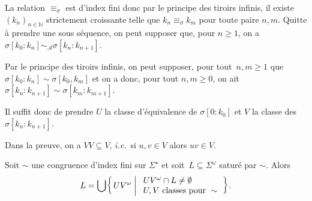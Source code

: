 \documentclass[./main]{subfiles}
\begin{document}
\begin{prv}
    La relation $\equiv_\sigma$ est d'index fini donc par le principe des tiroirs infinis, il existe $(k_n)_{n \in \mathds{N}}$ strictement croissante telle que $k_n \equiv_\sigma k_m$ pour toute paire $n,m$.
    Quitte à prendre une sous séquence, 
    on peut supposer que, pour $n \ge 1$, on a $\sigma[k_0 : k_n] \sim_\mathcal{A} \sigma[k_n : k_{n+1}]$.


    \begin{figure}[H]
      \centering
    \end{figure}

    Par le principe des tiroirs infinis, on peut supposer, pour tout~$n,m \ge 1$ que $\sigma[k_0 : k_n] \sim \sigma[k_0, k_m]$ et on a donc, pour tout $n,m \ge 0$, on ait $\sigma[k_n : k_{n+1}] \sim \sigma[k_m : k_{m+1}]$.

    Il suffit donc de prendre $U$ la classe d'équivalence de $\sigma[0 : k_0]$ et $V$ la classe des $\sigma[k_n : k_{n+1}]$.
  \end{prv}

  \begin{rmk}
    Dans la preuve, on a $V V \subseteq V$, \textit{i.e.}\ si $u, v \in V$ alors $uv \in V$.
  \end{rmk}

  \begin{crlr}
    Soit $\sim$ une congruence d'index fini sur $\Sigma^\star$ et soit~$L \subseteq \Sigma^\omega$ saturé par $\sim$.
    Alors
    \[
    L = \bigcup \mleft\{\, U V^\omega \;\middle|\;
    \begin{array}{l}
      UV^\omega \cap L \neq \emptyset\\
      U, V \text{ classes pour } \sim
    \end{array}\,\mright\} 
    .\]
  \end{crlr}
\end{document}
